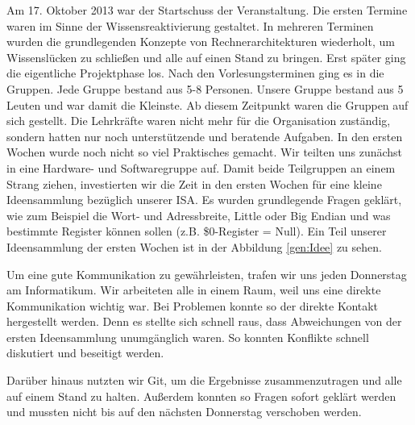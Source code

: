 Am 17. Oktober 2013 war der Startschuss der Veranstaltung. Die ersten Termine waren im Sinne der Wissensreaktivierung gestaltet. In mehreren Terminen wurden die grundlegenden Konzepte 
von Rechnerarchitekturen wiederholt, um Wissenslücken zu schließen und alle auf einen Stand zu bringen. Erst später ging die eigentliche Projektphase los.
Nach den Vorlesungsterminen ging es in die Gruppen. Jede Gruppe bestand aus 5-8 Personen. Unsere Gruppe bestand aus 5 Leuten und war damit die Kleinste. Ab diesem Zeitpunkt waren die Gruppen auf sich gestellt. Die Lehrkräfte waren nicht mehr für die Organisation zuständig, sondern hatten nur noch unterstützende und beratende Aufgaben.
In den ersten Wochen wurde noch nicht so viel Praktisches gemacht. Wir teilten uns zunächst in eine Hardware- und Softwaregruppe auf. Damit beide Teilgruppen an einem Strang ziehen, investierten wir die Zeit in den ersten Wochen für eine kleine Ideensammlung bezüglich unserer ISA.
Es wurden grundlegende Fragen geklärt, wie zum Beispiel die Wort- und Adressbreite, Little oder Big Endian und was bestimmte Register können sollen (z.B. \$0-Register = Null). Ein Teil unserer Ideensammlung der ersten Wochen ist in der Abbildung \autoref{gen:Idee} zu sehen.

Um eine gute Kommunikation zu gewährleisten, trafen wir uns jeden Donnerstag am Informatikum. Wir arbeiteten alle in einem Raum, weil uns eine direkte Kommunikation wichtig war. Bei Problemen konnte so der direkte Kontakt hergestellt werden. Denn es stellte sich schnell raus, dass Abweichungen von der ersten Ideensammlung unumgänglich waren. So konnten Konflikte schnell diskutiert und beseitigt werden.

Darüber hinaus nutzten wir Git, um die Ergebnisse zusammenzutragen und alle auf einem Stand zu halten. Außerdem konnten so Fragen sofort geklärt werden und mussten nicht bis auf den nächsten Donnerstag verschoben werden.

